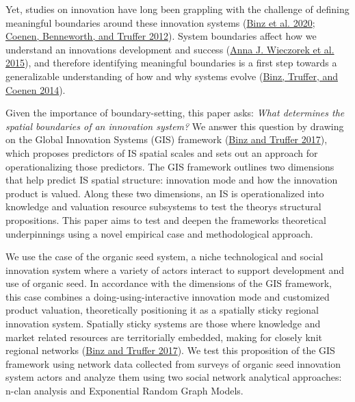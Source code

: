 \documentclass[twoside,12pt,final]{ucthesis-CA2012}
\begin{document}
\begin{ucmainmatter}
Yet, studies on innovation have long been grappling with the challenge
of defining meaningful boundaries around these innovation systems
(\protect\hyperlink{ref-Binz_Coenen_Murphy_Truffer_2020}{Binz et al. 2020}; \protect\hyperlink{ref-Coenen_Benneworth_Truffer_2012}{Coenen, Benneworth, and Truffer 2012}).
System boundaries affect how we understand an innovation\textquotesingle s development
and success
(\protect\hyperlink{ref-Wieczorek_Hekkert_Coenen_Harmsen_2015}{Anna J. Wieczorek et al. 2015}),
and therefore identifying meaningful boundaries is a first step towards
a generalizable understanding of how and why systems evolve
(\protect\hyperlink{ref-Binz_Truffer_Coenen_2014}{Binz, Truffer, and Coenen 2014}).

Given the importance of boundary-setting, this paper asks: \emph{What
determines the spatial boundaries of an innovation system?} We answer
this question by drawing on the \textquotesingle Global Innovation Systems\textquotesingle{} (GIS)
framework
(\protect\hyperlink{ref-Binz_Truffer_2017}{Binz and Truffer 2017}), which
proposes predictors of IS spatial scales and sets out an approach for
operationalizing those predictors. The GIS framework outlines two
dimensions that help predict IS spatial structure: innovation \textquotesingle mode\textquotesingle{}
and how the innovation product is valued. Along these two dimensions, an
IS is operationalized into knowledge and valuation resource subsystems
to test the theory\textquotesingle s structural propositions. This paper aims to test
and deepen the framework\textquotesingle s theoretical underpinnings using a novel
empirical case and methodological approach.

We use the case of the organic seed system, a niche technological and
social innovation system where a variety of actors interact to support
development and use of organic seed. In accordance with the dimensions
of the GIS framework, this case combines a \textquotesingle doing-using-interactive\textquotesingle{}
innovation mode and customized product valuation, theoretically
positioning it as a \textquotesingle spatially sticky\textquotesingle{} regional innovation system.
Spatially sticky systems are those where knowledge and market related
resources are territorially embedded, making for closely knit regional
networks
(\protect\hyperlink{ref-Binz_Truffer_2017}{Binz and Truffer 2017}). We test
this proposition of the GIS framework using network data collected from
surveys of organic seed innovation system actors and analyze them using
two social network analytical approaches: n-clan analysis and
Exponential Random Graph Models.


\end{ucmainmatter}
\end{document}
